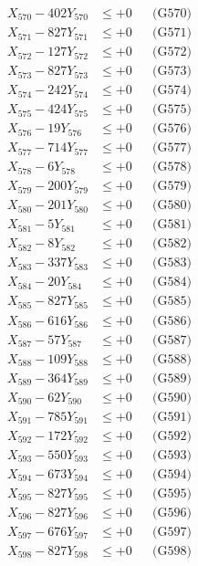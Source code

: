 \documentclass[a4paper,10pt]{article}
\begin{document}
{\begin{align}
X_{570} - 402Y_{570} &\leq +0 && \text{(G570)} \\
\allowbreak
X_{571} - 827Y_{571} &\leq +0 && \text{(G571)} \\
X_{572} - 127Y_{572} &\leq +0 && \text{(G572)} \\
X_{573} - 827Y_{573} &\leq +0 && \text{(G573)} \\
X_{574} - 242Y_{574} &\leq +0 && \text{(G574)} \\
X_{575} - 424Y_{575} &\leq +0 && \text{(G575)} \\
X_{576} - 19Y_{576} &\leq +0 && \text{(G576)} \\
X_{577} - 714Y_{577} &\leq +0 && \text{(G577)} \\
X_{578} - 6Y_{578} &\leq +0 && \text{(G578)} \\
X_{579} - 200Y_{579} &\leq +0 && \text{(G579)} \\
X_{580} - 201Y_{580} &\leq +0 && \text{(G580)} \\
\allowbreak
X_{581} - 5Y_{581} &\leq +0 && \text{(G581)} \\
X_{582} - 8Y_{582} &\leq +0 && \text{(G582)} \\
X_{583} - 337Y_{583} &\leq +0 && \text{(G583)} \\
X_{584} - 20Y_{584} &\leq +0 && \text{(G584)} \\
X_{585} - 827Y_{585} &\leq +0 && \text{(G585)} \\
X_{586} - 616Y_{586} &\leq +0 && \text{(G586)} \\
X_{587} - 57Y_{587} &\leq +0 && \text{(G587)} \\
X_{588} - 109Y_{588} &\leq +0 && \text{(G588)} \\
X_{589} - 364Y_{589} &\leq +0 && \text{(G589)} \\
X_{590} - 62Y_{590} &\leq +0 && \text{(G590)} \\
\allowbreak
X_{591} - 785Y_{591} &\leq +0 && \text{(G591)} \\
X_{592} - 172Y_{592} &\leq +0 && \text{(G592)} \\
X_{593} - 550Y_{593} &\leq +0 && \text{(G593)} \\
X_{594} - 673Y_{594} &\leq +0 && \text{(G594)} \\
X_{595} - 827Y_{595} &\leq +0 && \text{(G595)} \\
X_{596} - 827Y_{596} &\leq +0 && \text{(G596)} \\
X_{597} - 676Y_{597} &\leq +0 && \text{(G597)} \\
X_{598} - 827Y_{598} &\leq +0 && \text{(G598)} \\

\end{align}}
\end{document}
